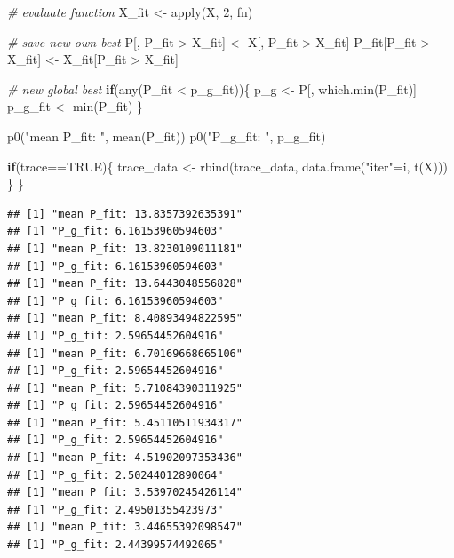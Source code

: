 \documentclass[
  oneside]{book}
\newenvironment{Shaded}{\begin{snugshade}}{\end{snugshade}}
\newcommand{\CommentTok}[1]{\textcolor[rgb]{0.56,0.35,0.01}{\textit{#1}}}
\newcommand{\ConstantTok}[1]{\textcolor[rgb]{0.00,0.00,0.00}{#1}}
\newcommand{\ControlFlowTok}[1]{\textcolor[rgb]{0.13,0.29,0.53}{\textbf{#1}}}
\newcommand{\DecValTok}[1]{\textcolor[rgb]{0.00,0.00,0.81}{#1}}
\newcommand{\FunctionTok}[1]{\textcolor[rgb]{0.00,0.00,0.00}{#1}}
\newcommand{\NormalTok}[1]{#1}
\newcommand{\OtherTok}[1]{\textcolor[rgb]{0.56,0.35,0.01}{#1}}
\newcommand{\SpecialCharTok}[1]{\textcolor[rgb]{0.00,0.00,0.00}{#1}}
\newcommand{\StringTok}[1]{\textcolor[rgb]{0.31,0.60,0.02}{#1}}
\begin{document}
\begin{Shaded}
\begin{Highlighting}[]
  \CommentTok{\# evaluate function}
\NormalTok{  X\_fit }\OtherTok{\textless{}{-}} \FunctionTok{apply}\NormalTok{(X, }\DecValTok{2}\NormalTok{, fn)}
  
  \CommentTok{\# save new own best}
\NormalTok{  P[, P\_fit }\SpecialCharTok{\textgreater{}}\NormalTok{ X\_fit] }\OtherTok{\textless{}{-}}\NormalTok{ X[, P\_fit }\SpecialCharTok{\textgreater{}}\NormalTok{ X\_fit]}
\NormalTok{  P\_fit[P\_fit }\SpecialCharTok{\textgreater{}}\NormalTok{ X\_fit] }\OtherTok{\textless{}{-}}\NormalTok{ X\_fit[P\_fit }\SpecialCharTok{\textgreater{}}\NormalTok{ X\_fit]}
  
  \CommentTok{\# new global best}
  \ControlFlowTok{if}\NormalTok{(}\FunctionTok{any}\NormalTok{(P\_fit }\SpecialCharTok{\textless{}}\NormalTok{ p\_g\_fit))\{}
\NormalTok{    p\_g }\OtherTok{\textless{}{-}}\NormalTok{ P[, }\FunctionTok{which.min}\NormalTok{(P\_fit)]}
\NormalTok{    p\_g\_fit }\OtherTok{\textless{}{-}} \FunctionTok{min}\NormalTok{(P\_fit)}
\NormalTok{  \}}
  
  \FunctionTok{p0}\NormalTok{(}\StringTok{"mean P\_fit: "}\NormalTok{, }\FunctionTok{mean}\NormalTok{(P\_fit))}
  \FunctionTok{p0}\NormalTok{(}\StringTok{"P\_g\_fit: "}\NormalTok{, p\_g\_fit)}
  
  \ControlFlowTok{if}\NormalTok{(trace}\SpecialCharTok{==}\ConstantTok{TRUE}\NormalTok{)\{}
\NormalTok{    trace\_data }\OtherTok{\textless{}{-}} \FunctionTok{rbind}\NormalTok{(trace\_data, }\FunctionTok{data.frame}\NormalTok{(}\StringTok{"iter"}\OtherTok{=}\NormalTok{i, }\FunctionTok{t}\NormalTok{(X)))}
\NormalTok{  \}}
\NormalTok{\}}
\end{Highlighting}
\end{Shaded}

\begin{verbatim}
## [1] "mean P_fit: 13.8357392635391"
## [1] "P_g_fit: 6.16153960594603"
## [1] "mean P_fit: 13.8230109011181"
## [1] "P_g_fit: 6.16153960594603"
## [1] "mean P_fit: 13.6443048556828"
## [1] "P_g_fit: 6.16153960594603"
## [1] "mean P_fit: 8.40893494822595"
## [1] "P_g_fit: 2.59654452604916"
## [1] "mean P_fit: 6.70169668665106"
## [1] "P_g_fit: 2.59654452604916"
## [1] "mean P_fit: 5.71084390311925"
## [1] "P_g_fit: 2.59654452604916"
## [1] "mean P_fit: 5.45110511934317"
## [1] "P_g_fit: 2.59654452604916"
## [1] "mean P_fit: 4.51902097353436"
## [1] "P_g_fit: 2.50244012890064"
## [1] "mean P_fit: 3.53970245426114"
## [1] "P_g_fit: 2.49501355423973"
## [1] "mean P_fit: 3.44655392098547"
## [1] "P_g_fit: 2.44399574492065"
\end{verbatim}
\end{document}
